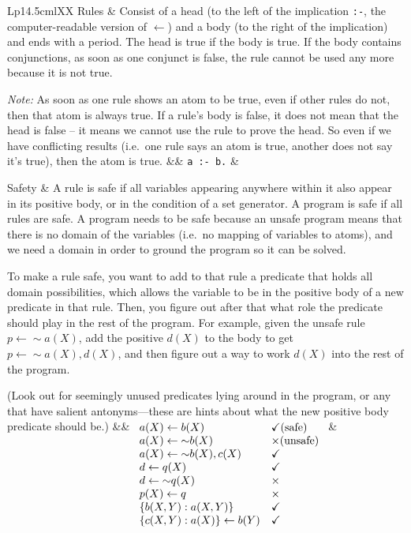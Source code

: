 \documentclass[9pt,a4paper,landscape]{article}
\begin{document}
{\begin{longtable}{Lp{14.5cm}lXX}
Rules
& Consist of a head (to the left of the implication \texttt{:-}, the computer-readable version of $\leftarrow$) and a body (to the right of the implication) and ends with a period.
The head is true if the body is true.
If the body contains conjunctions, as soon as one conjunct is false, the rule cannot be used any more because it is not true. \newline

\textit{Note:} As soon as one rule shows an atom to be true, even if other rules do not, then that atom is always true. 
If a rule's body is false, it does not mean that the head is false -- it means we cannot use the rule to prove the head.
So even if we have conflicting results (i.e.\ one rule says an atom is true, another does not say it's true), then the atom is true.
&& \texttt{a :- b.} &\\ \midrule

Safety
&  A rule is safe if all variables appearing anywhere within it also appear in its positive body, or in the condition of a set generator. 
A program is safe if all rules are safe.
A program needs to be safe because an unsafe program means that there is no domain of the variables (i.e.\ no mapping of variables to atoms), and we need a domain in order to ground the program so it can be solved. \newline

To make a rule safe, you want to add to that rule a predicate that holds all domain possibilities, which allows the variable to be in the positive body of a new predicate in that rule.
Then, you figure out after that what role the predicate should play in the rest of the program.
For example, given the unsafe rule $p \leftarrow {\sim}a(X)$, add the positive $d(X)$ to the body to get $p \leftarrow {\sim}a(X), d(X)$, and then figure out a way to work $d(X)$ into the rest of the program. \newline

(Look out for seemingly unused predicates lying around in the program, or any that have salient antonyms---these are hints about what the new positive body predicate should be.)
&& 
$\begin{array}[t]{ll}
	a(X) \leftarrow b(X) & \checkmark \text{(safe)} \\
	a(X) \leftarrow {\sim}b(X) & \times \text{(unsafe)}\\
	a(X) \leftarrow {\sim}b(X), c(X) & \checkmark \\
	d \leftarrow q(X) & \checkmark \\
	d \leftarrow {\sim}q(X) & \times \\
	p(X) \leftarrow q & \times \\
	\{b(X,Y) : a(X,Y)\} & \checkmark \\
	\{c(X,Y) : a(X)\} \leftarrow b(Y) & \checkmark
\end{array}$ &\\ \midrule	


\end{longtable}}
\end{document}
